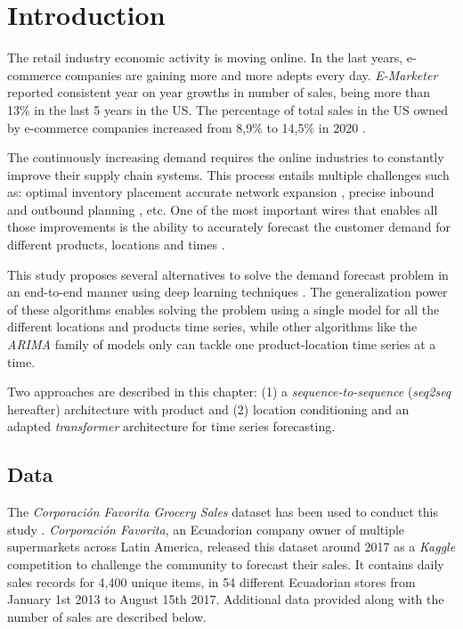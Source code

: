 \section{Introduction}
The retail industry economic activity is moving online. In the last years, e-commerce companies are gaining more and more adepts every day. \textit{E-Marketer} \autocite{emarketer2019, emarketer2020} reported consistent year on year growths in number of sales, being more than 13\% in the last 5 years in the US. The percentage of total sales in the US owned by e-commerce companies increased from 8,9\% to 14,5\% in 2020 \autocite{emarketer2019, emarketer2020}.

The continuously increasing demand requires the online industries to constantly improve their supply chain systems. This process entails multiple challenges such as: optimal inventory placement \autocite{graves2008}accurate network expansion \autocite{hossein2017}, precise inbound and outbound planning \autocite{kaipia2009}, etc. One of the most important wires that enables all those improvements is the ability to accurately forecast the customer demand for different products, locations and times \autocite{forslund2007}.

This study proposes several alternatives to solve the demand forecast problem in an end-to-end manner using deep learning techniques \autocite{Goodfellow2016}. The generalization power of these algorithms enables solving the problem using a single model for all the different locations and products time series, while other algorithms like the \textit{ARIMA} family of models \autocite{Hyndman2018} only can tackle one product-location time series at a time.

Two approaches are described in this chapter: (1) a \textit{sequence-to-sequence} (\textit{seq2seq} hereafter) architecture with product and (2) location conditioning and an adapted \textit{transformer} architecture for time series forecasting.


\subsection{Data} \label{sec:salesforecast_data}
The \textit{Corporación Favorita Grocery Sales} dataset  has been used to conduct this study \autocite{corporacionfavoritadataset2018}. \textit{Corporación Favorita}, an Ecuadorian company owner of multiple supermarkets across Latin America, released this dataset around 2017 as a \textit{Kaggle} competition to challenge the community to forecast their sales. It contains daily sales records for 4,400 unique items, in 54 different Ecuadorian stores from January 1st 2013 to August 15th 2017. Additional data provided along with the number of sales are described below.

